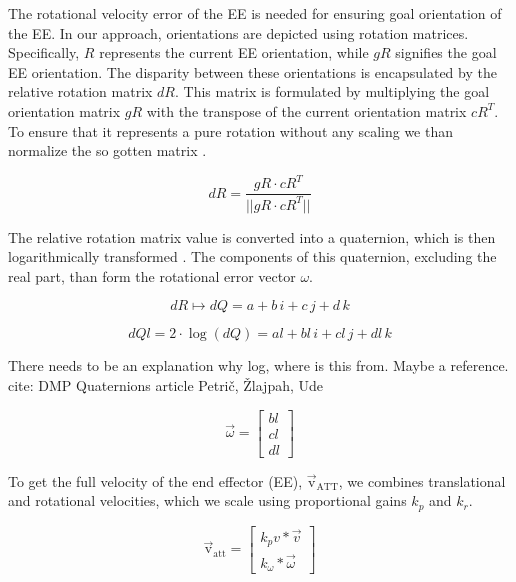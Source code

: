 \documentclass[letterpaper, 10 pt, conference]{ieeeconf}  %
\begin{document}
The rotational velocity error of the EE is needed for ensuring goal orientation of the EE. In our approach, orientations are depicted using rotation matrices. Specifically, \( R \) represents the current EE orientation, while \( gR \) signifies the goal EE orientation. The disparity between these orientations is encapsulated by the relative rotation matrix \( dR \). This matrix is formulated by multiplying the goal orientation matrix \( gR \) with the transpose of the current orientation matrix \( cR^{T} \). To ensure that it represents a pure rotation without any scaling we than normalize the so gotten matrix .

\begin{equation}
	dR = \frac{gR \cdot cR^{T}}{||gR \cdot cR^{T}||}
	\label{eq: rot_diff_mat}
\end{equation}

The relative rotation matrix value is converted into a quaternion, which is then logarithmically transformed . The components of this quaternion, excluding the real part, than form the rotational error vector \( \omega \).

\begin{equation}
	dR \mapsto dQ = a + b \, i + c \, j + d \, k
	\label{eq: quat_mapsto}
\end{equation}

\begin{equation}
	dQl = 2 \cdot \log(dQ) = al + bl \, i + cl \, j + dl \, k
	\label{eq:quat_log}
\end{equation}

\alert{There needs to be an explanation why log, where is this from. Maybe a reference. cite: DMP Quaternions article Petrič, Žlajpah, Ude}



\begin{equation}
	\vec{\omega} =
	\begin{bmatrix}
		bl \\
		cl \\
		dl
	\end{bmatrix}
	\label{eq:rot_error_vector}
\end{equation}

To get the full velocity of the end effector (EE), \( \mathrm{\vec{v}_{ATT}} \), we combines translational and rotational velocities, which we scale using proportional gains \( k_p \) and \( k_r \).

\begin{equation}
	\mathrm{\vec{v}_{att}} = 
	\begin{bmatrix}
		k_pv* \vec{v}   \\
		k_{\omega} * \vec{\omega}
	\end{bmatrix}
	\label{eq:ee_velocity}
\end{equation}
\end{document}
